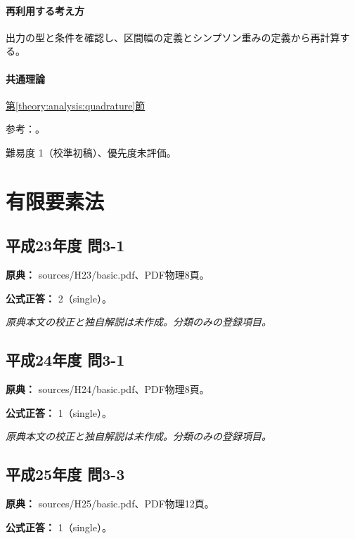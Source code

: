 \paragraph{再利用する考え方} 出力の型と条件を確認し、区間幅の定義とシンプソン重みの定義から再計算する。

\paragraph{共通理論} \hyperref[theory:analysis:quadrature]{第\ref*{theory:analysis:quadrature}節}

\par 参考：\cite{nist_quadrature}。

\par 難易度 1（校準初稿）、優先度未評価。

\section{有限要素法}

\subsection{平成23年度 問3-1}
\label{q:h23-reg-basic-3-1}

\noindent\textbf{原典：} sources/H23/basic.pdf、PDF物理8頁。

\textbf{公式正答：} 2（single）。

\par\textit{原典本文の校正と独自解説は未作成。分類のみの登録項目。}

\subsection{平成24年度 問3-1}
\label{q:h24-reg-basic-3-1}

\noindent\textbf{原典：} sources/H24/basic.pdf、PDF物理8頁。

\textbf{公式正答：} 1（single）。

\par\textit{原典本文の校正と独自解説は未作成。分類のみの登録項目。}

\subsection{平成25年度 問3-3}
\label{q:h25-reg-basic-3-3}

\noindent\textbf{原典：} sources/H25/basic.pdf、PDF物理12頁。

\textbf{公式正答：} 1（single）。

